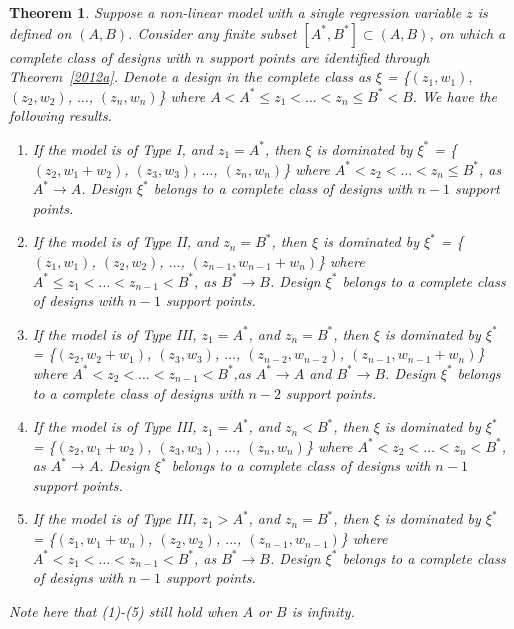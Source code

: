 \documentclass[12pt]{amsart}
\newtheorem{theorem}{Theorem}[section]
\theoremstyle{definition}
\theoremstyle{remark}
\numberwithin{equation}{section}
\begin{document}
\begin{theorem}\label{removepts}
 Suppose a non-linear model with a single regression variable $z$ is defined on $(A,B)$. Consider any finite subset $[A^*,B^*]\subset (A,B)$, on which a complete class of designs with $n$ support points are identified through Theorem~\ref{2012a}. Denote a design in the complete class as  $\xi$ = \{$(z_1,w_1)$, $(z_2,w_2)$, $\ldots$, $(z_n,w_n)$\} where $A<A^*\le z_1< \ldots< z_n \le B^*<B$. We have the following results.\begin{enumerate}
     
     \item If the model is of Type I, and $z_1=A^*$, then $\xi$ is dominated by $\xi^*$ = \{$(z_2,w_1+w_2)$, $(z_3,w_3)$, $\ldots$, $(z_n,w_n)$\} where $A^* < z_2 <\ldots< z_n\le B^*$, as $A^*\to A$.  Design $\xi^*$ belongs to a complete class of designs with $n-1$ support points.
     \item If the model is of Type II, and $z_n=B^*$, then $\xi$ is dominated by $\xi^*$ = \{$(z_1,w_1)$, $(z_2,w_2)$, $\ldots$, $(z_{n-1},w_{n-1}+w_n)$\} where $A^*\le z_1 <\ldots< z_{n-1}< B^*$, as $B^*\to B$.   Design $\xi^*$ belongs to a complete class of designs with $n-1$ support points.
     \item If the model is of Type III, $z_1 = A^*$, and $z_n=B^*$, then $\xi$ is dominated by $\xi^*$ = \{$(z_2,w_2+w_1)$, $(z_3,w_3)$, $\ldots$, $(z_{n-2},w_{n-2})$,  $(z_{n-1},w_{n-1}+w_n)$\} where $A^*< z_2 <\ldots< z_{n-1}< B^*$,as $A^*\to A$ and $B^*\to B$.   Design $\xi^*$ belongs to a complete class of designs with $n-2$ support points.
     \item If the model is of Type III, $z_1 = A^*$, and $z_n<B^*$, then $\xi$ is dominated by $\xi^*$ = \{$(z_2,w_1+w_2)$, $(z_3,w_3)$, $\ldots$, $(z_n,w_n)$\} where $A^* < z_2 <\ldots< z_n< B^*$, as $A^*\to A$.  Design $\xi^*$ belongs to a complete class of designs with $n-1$ support points.
     \item If the model is of Type III, $z_1 > A^*$, and $z_n = B^*$, then $\xi$ is dominated by $\xi^*$ = \{$(z_1,w_1+w_n)$, $(z_2,w_2)$, $\ldots$, $(z_{n-1},w_{n-1})$\} where $A^*< z_1 <\ldots< z_{n-1}< B^*$, as $B^*\to B$. Design $\xi^*$ belongs to a complete class of designs with $n-1$ support points.
     
    
 \end{enumerate}
 Note here that (1)-(5) still hold when $A$ or $B$ is infinity. 
\end{theorem}
\end{document}
